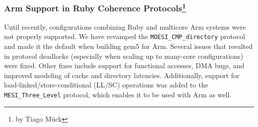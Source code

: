 

\subsubsection[Arm Support and Extensions]{Arm Support in Ruby Coherence Protocols\footnote{by Tiago M{\"u}ck}}

Until recently, configurations combining Ruby and multicore Arm systems were not properly supported.
We have revamped the \lstinline|MOESI_CMP_directory| protocol and made it the default when building gem5 for Arm.
Several issues that resulted in protocol deadlocks (especially when scaling up to many-core configurations) were fixed.
Other fixes include support for functional accesses, DMA bugs, and improved modeling of cache and directory latencies.
Additionally, support for load-linked/store-conditional (LL/SC) operations was added to the \lstinline|MESI_Three_Level| protocol, which enables it to be used with Arm as well.
